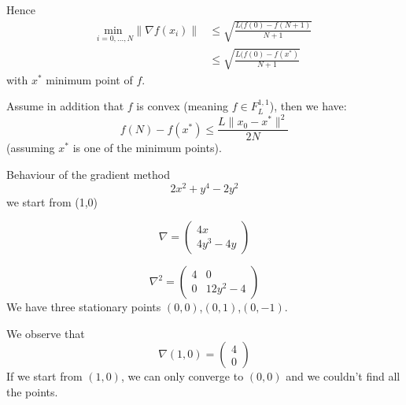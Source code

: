 Hence
\begin{align*}
\underset{i=0,...,N}{\text{min }} \|\nabla f(x_{i})\| & \leq \sqrt{\frac{L(f(0)-f(N+1)}{N+1}} \\
& \leq \sqrt{\frac{L(f(0)-f(x^*)}{N+1}}
\end{align*}
with $x^*$ minimum point of $f$.

\begin{lemma}
Assume in addition that $f$ is convex (meaning $f \in F^{1,1}_{L}$)\footnotemark, then we have: 
$$ f(N)-f(x^*) \leq \frac{L\|x_{0}-x^*\|^{2}}{2N} $$ 
 (assuming $x^*$ is one of the minimum points).
\end{lemma}
 
\begin{example}\begin{leftbar} Behaviour of the gradient method
$$2x^{2}+y^{4}-2y^{2}$$
we start from (1,0)

 \begin{equation*}
   \nabla=
 \begin{pmatrix}
4x  \\
4y^{3}-4y
\end{pmatrix}
\end{equation*}

\begin{equation*}
   \nabla^{2}=
 \begin{pmatrix}
4 & 0 \\
0 & 12y^{2}-4
\end{pmatrix}
\end{equation*}
We have three stationary points $(0,0)$,$(0,1)$,$(0,-1)$. 

We observe that
 \begin{equation*}
   \nabla(1,0)=
 \begin{pmatrix}
4  \\
0
\end{pmatrix}
\end{equation*}
If we start from $(1,0)$, we can only converge to $(0,0)$ and we couldn't find all the points. 
\end{leftbar}\end{example}








%